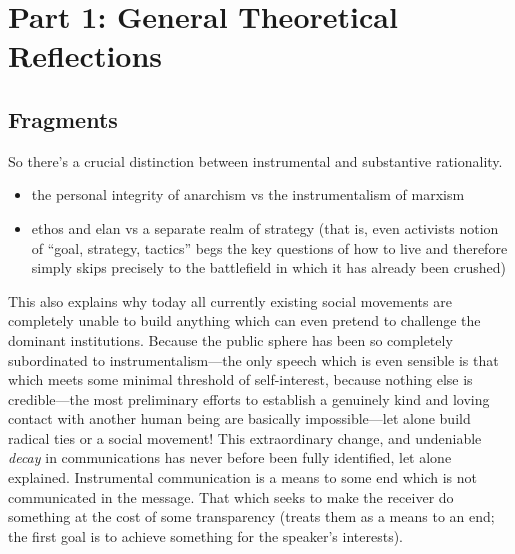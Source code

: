 \documentclass[12pt,book]{article}
\begin{document}
{
\hypersetup{linkcolor=black}
\setcounter{tocdepth}{2}
\tableofcontents
}
\section{Part 1: General Theoretical
Reflections}\label{part-1-general-theoretical-reflections}

\subsection{Fragments}\label{fragments}

So there's a crucial distinction between instrumental and substantive
rationality.

\begin{itemize}
\item
  the personal integrity of anarchism vs the instrumentalism of marxism
\item
  ethos and elan vs a separate realm of strategy (that is, even
  activists notion of ``goal, strategy, tactics'' begs the key questions
  of how to live and therefore simply skips precisely to the battlefield
  in which it has already been crushed)
\end{itemize}

This also explains why today all currently existing social movements are
completely unable to build anything which can even pretend to challenge
the dominant institutions. Because the public sphere has been so
completely subordinated to instrumentalism---the only speech which is
even sensible is that which meets some minimal threshold of
self-interest, because nothing else is credible---the most preliminary
efforts to establish a genuinely kind and loving contact with another
human being are basically impossible---let alone build radical ties or a
social movement! This extraordinary change, and undeniable \emph{decay}
in communications has never before been fully identified, let alone
explained. Instrumental communication is a means to some end which is
not communicated in the message. That which seeks to make the receiver
do something at the cost of some transparency (treats them as a means to
an end; the first goal is to achieve something for the speaker's
interests).
\end{document}
